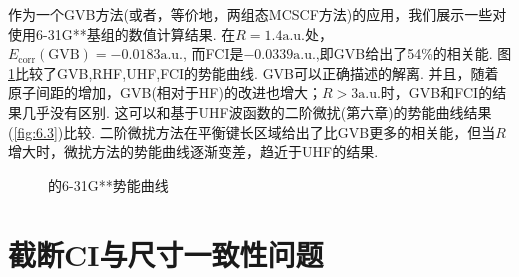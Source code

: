 \exercise{}


作为一个GVB方法(或者，等价地，两组态MCSCF方法)的应用，我们展示一些对使用6-31G**基组的数值计算结果.
在$R=1.4\text{a.u.}$处，
$E_{\text{corr}}(\text{GVB})= -0.0183\text{a.u.}$,
而FCI是$ -0.0339\text{a.u.}$,即GVB给出了54\%的相关能.
图\ref{fig:4.4}比较了GVB,RHF,UHF,FCI的势能曲线.
GVB可以正确描述的解离.
并且，随着原子间距的增加，GVB(相对于HF)的改进也增大；$R>3\text{a.u.}$时，GVB和FCI的结果几乎没有区别.
这可以和基于UHF波函数的二阶微扰(第六章)的势能曲线结果(\ref{fig:6.3})比较.
二阶微扰方法在平衡键长区域给出了比GVB更多的相关能，但当$R$增大时，微扰方法的势能曲线逐渐变差，趋近于UHF的结果.

\begin{figure}[H]
	\caption{的6-31G**势能曲线}
\label{fig:4.4}
\end{figure}

\section{截断CI与尺寸一致性问题}
\label{sec4.6}




\theendnotes
